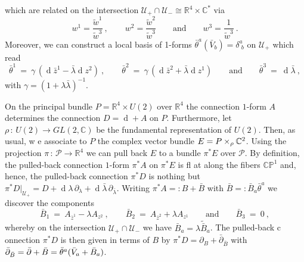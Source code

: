 \documentclass[a4paper,11pt,english]{article}
\numberwithin{equation}{section}
\newcommand{\D}[1]{\operatorname{d#1}}
\renewcommand{\=}{\ =\ }
\begin{document}
which are related on the intersection $\mathcal{U}_+\cap\mathcal{U}_-
\cong\mathbb{R}^4\times\mathbb{C}^*$ via
\begin{equation}
 w^1=\frac{\tilde{w}^1}{\tilde{w}^3}\ ,\qquad 
 w^2=\frac{\tilde{w}^2}{\tilde{w}^3}
 \qquad\text{and}\qquad w^3=\frac{1}{\tilde{w}^3}\ .
\end{equation}
Moreover, we can construct a local basis of 1-forms $\bar{\theta}^a(\bar{V%
}_b)=\delta^a_{\,\,b}$ on $\mathcal{U}_+$ which read
\begin{equation}
 \bar{\theta}^1 \= \gamma\,(\D{}\bar{z}^1-\bar{\lambda}\D{}z^2)\ ,\qquad
 \bar{\theta}^2 \= \gamma\,(\D{}\bar{z}^2+\bar{\lambda}\D{}z^1)
 \qquad\text{and}\qquad  \bar{\theta}^3 \= \D{}\bar{\lambda}\ ,
\end{equation}
with $\gamma=(1+\lambda\bar{\lambda})^{-1}$.

On the principal bundle $P=\mathbb{R}^4\times U(2)$ over $\mathbb{R}^4$ %
 the connection $1$-form ${A}$ determines the connection $D=\D{%
}+{A}$ on $P$. Furthermore, let $\rho\,:\,U(2)\rightarrow GL(2,\mathbb{C})$ 
be the fundamental representation of $U(2)$. Then, as usual, w%
e associate to $P$ the complex vector bundle $E=P\times_\rho\mathbb{C}^%
2$. Using the projection $\pi\,:\,\mathcal{P}\rightarrow\mathbb{R}^4$ we %
can pull back $E$ to a bundle $\pi^*E$ over $\mathcal{P}$. By definition, %
 the pulled-back connection $1$-form $\pi^*{A}$ on $\pi^*E$ is fl%
at along the fibers $\mathbb{CP}^1$ and, hence, the pulled-back connection
$\pi^*D$ is nothing but $\pi^*D|_{\mathcal{U}_+}=D+\D{}\lambda\,
\partial_\lambda+\D{}\bar{\lambda}\,\partial_{\bar{\lambda}}$. Writing $\pi^*%
{A}=:{B}+\bar{{B}}$ with $\bar{{B}}=:\bar{{B}}_a\bar{\theta}^a$ 
we discover the components
\begin{equation}
 \bar{{B}}_1 \= {A}_{\bar{z}^1}-\lambda{A}_{z^2}\ ,\qquad
 \bar{{B}}_2 \= {A}_{\bar{z}^2}+\lambda{A}_{z^1}
 \qquad\text{and} \qquad \bar{{B}}_3 \= 0\ ,
\end{equation}
whereby on the intersection $\mathcal{U}_+\cap\mathcal{U}_-$ we have 
$\bar{{B}}_a=\lambda\tilde{\bar{{B}}}_a$. The pulled-back c%
onnection $\pi^*D$ is then given in terms of ${B}$ by $\pi^*D=
\partial_{{B}}+\bar{\partial}_{\bar{{B}}}$ with $\bar{\partial}_%
{\bar{{B}}}=\bar{\partial}+\bar{{B}}=\bar{\theta}^a(\bar{V}_a+\bar{B}_a)$. 
\end{document}
